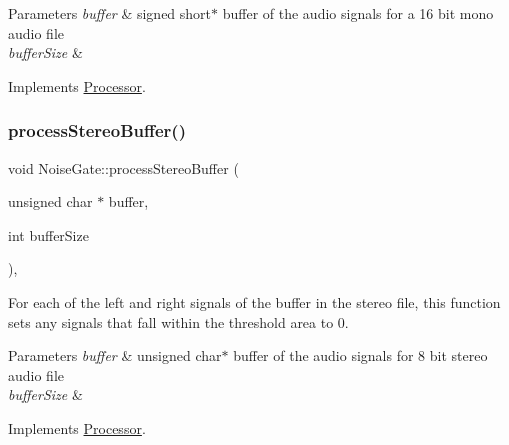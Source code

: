 \begin{DoxyParams}{Parameters}
{\em buffer} & signed short$\ast$ buffer of the audio signals for a 16 bit mono audio file \\
\hline
{\em buffer\+Size} & \\
\hline
\end{DoxyParams}


Implements \hyperlink{classProcessor}{Processor}.

\mbox{\label{classNoiseGate_aeb214c7a4183ee24ef073a3e5c029f94}} 
\subsubsection{\texorpdfstring{process\+Stereo\+Buffer()}{processStereoBuffer()}\hspace{0.1cm}{\footnotesize\ttfamily [1/2]}}
{\footnotesize\ttfamily void Noise\+Gate\+::process\+Stereo\+Buffer (\begin{DoxyParamCaption}\item[{unsigned char $\ast$}]{buffer,  }\item[{int}]{buffer\+Size }\end{DoxyParamCaption})\hspace{0.3cm}{\ttfamily [override]}, {\ttfamily [virtual]}}



For each of the left and right signals of the buffer in the stereo file, this function sets any signals that fall within the threshold area to 0. 


\begin{DoxyParams}{Parameters}
{\em buffer} & unsigned char$\ast$ buffer of the audio signals for 8 bit stereo audio file \\
\hline
{\em buffer\+Size} & \\
\hline
\end{DoxyParams}


Implements \hyperlink{classProcessor}{Processor}.

\mbox{\label{classNoiseGate_a95327c88365a0371c127b9c63bbe56bc}} 
